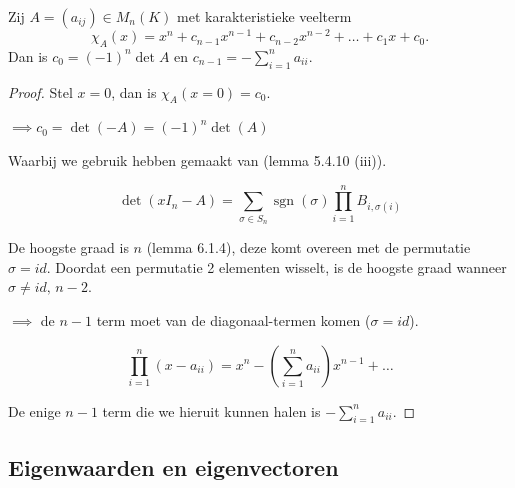 \begin{lemma}[6.1.6]
    Zij $A = (a_{ij}) \in M_n(K)$ met karakteristieke veelterm
    \[ \chi_A(x) = x^n + c_{n-1}x^{n-1} + c_{n-2}x^{n-2} + \dots + c_1x + c_0. \]
    Dan is $c_0 = (-1)^n \det A$ en $c_{n-1} = -\sum_{i=1}^n a_{ii}$.
\end{lemma}
\begin{proof}
    Stel \(x = 0\), dan is \(\chi_A(x=0) = c_0\).

    \(\implies c_0 = \det(-A) = (-1)^n \det(A)\)

    Waarbij we gebruik hebben gemaakt van (lemma 5.4.10 (iii)).



    $$\det(xI_n - A) = \sum_{\sigma \in S_n} \operatorname{sgn}(\sigma) \prod_{i=1}^n B_{i, \sigma(i)} $$ 

    De hoogste graad is \(n\) (lemma 6.1.4), deze komt overeen met de permutatie \(\sigma = id\).
    Doordat een permutatie 2 elementen wisselt, is de hoogste graad wanneer \(\sigma \neq id, \, n-2\).

    \(\implies\) de \(n-1\) term moet van de diagonaal-termen komen (\(\sigma = id\)).

    \[\prod_{i=1}^n (x - a_{ii}) = x^n - \left(\sum_{i=1}^n a_{ii}\right)x^{n-1} + \dots\]

    De enige \(n-1\) term die we hieruit kunnen halen is \(-\sum_{i=1}^{n} a_{ii}\).


\end{proof}

\subsection{Eigenwaarden en eigenvectoren}

